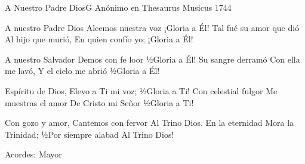 \documentclass[12pt, spanish]{book}
\newcommand{\RevDate}{\today}
\newcommand{\NotCCLIed}{\relax}
\begin{document}
\begin{song}{A Nuestro Padre Dios}{G}
  {} %
  {Anónimo en Thesaurus Musicus 1744}
  {} %
  {} %


  \begin{SBVerse}
A nuestro Padre Dios
Alcemos nuestra voz
¡Gloria a Él!
Tal fué su amor que dió
Al hijo que murió,
En quien confío yo;
¡Gloria a Él!
  \end{SBVerse}

  \begin{SBVerse}
A nuestro Salvador
Demos con fe loor
½Gloria a Él!
Su sangre derramó
Con ella me lavó,
Y el cielo me abrió
½Gloria a Él!
  \end{SBVerse}

  \begin{SBVerse}
Espíritu de Dios,
Elevo a Ti mi voz;
½Gloria a Ti!
Con celestial fulgor
Me muestras el amor
De Cristo mi Señor
½Gloria a Ti!
  \end{SBVerse}

  \begin{SBVerse}
Con gozo y amor,
Cantemos con fervor
Al Trino Dios.
En la eternidad
Mora la Trinidad;
½Por siempre alabad
Al Trino Dios!
  \end{SBVerse}

\ifChordBk
\begin{SBOpGroup}
    Acordes:
  Mayor
  \end{SBOpGroup}
\fi
\end{song}
\end{document}
